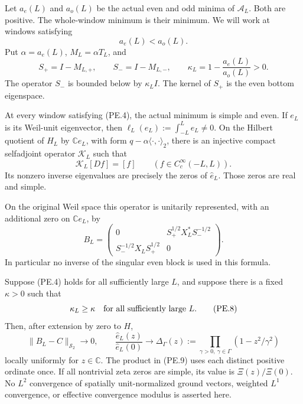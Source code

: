 Let \(a_e(L)\) and \(a_o(L)\) be the actual even and odd minima of
\(\mathscr A_L\).  Both are positive.  The whole-window minimum is
their minimum.  We will work at windows satisfying
\[
                 a_e(L)<a_o(L).
 \tag{PE.4}
\]
Put \(\alpha=a_e(L)\), \(M_L=\alpha T_L\), and
\[
 S_+=I-M_{L,+},\qquad S_-=I-M_{L,-},\qquad
 \kappa_L=1-\frac{a_e(L)}{a_o(L)}>0 .
 \tag{PE.5}
\]
The operator \(S_-\) is bounded below by \(\kappa_L I\).
The kernel of \(S_+\) is the even bottom eigenspace.

\begin{theorem}
\label{AC-S51}
At every window satisfying (PE.4), the actual minimum is simple
and even.  If \(e_L\) is its Weil-unit eigenvector, then
\(\ell_L(e_L):=\int_{-L}^L e_L\ne0\).
On the Hilbert quotient of \(H_L\) by \(\mathbb C e_L\), with form
\(q-\alpha\langle\cdot,\cdot\rangle_2\), there is an injective compact
selfadjoint operator \(\mathcal K_L\) such that
\[
 \mathcal K_L[Df]=[f]\qquad(f\in C_c^\infty(-L,L)).
 \tag{PE.6}
\]
Its nonzero inverse eigenvalues are precisely the zeros of
\(\widehat e_L\).  Those zeros are real and simple.

On the original Weil space this operator is unitarily represented,
with an additional zero on \(\mathbb C e_L\), by
\[
 B_L=
 \begin{pmatrix}
  0&S_+^{1/2}X_L^*S_-^{-1/2}\\
  S_-^{-1/2}X_LS_+^{1/2}&0
 \end{pmatrix}.
 \tag{PE.7}
\]
In particular no inverse of the singular even block is used in this
formula.

Suppose (PE.4) holds for all sufficiently large \(L\), and suppose
there is a fixed \(\kappa>0\) such that
\[
       \kappa_L\ge\kappa
       \quad\hbox{for all sufficiently large }L.
 \tag{PE.8}
\]
Then, after extension by zero to \(H\),
\[
 \|B_L-C\|_{\mathcal S_2}\longrightarrow0,\qquad
 \frac{\widehat e_L(z)}{\widehat e_L(0)}
       \longrightarrow
       \Delta_\Gamma(z):=
          \prod_{\gamma>0,\ \gamma\in\Gamma}
                    (1-z^2/\gamma^2)
 \tag{PE.9}
\]
locally uniformly for \(z\in\mathbb C\).
The product in (PE.9) uses each distinct positive ordinate once.
If all nontrivial zeta zeros are simple, its value is
\(\Xi(z)/\Xi(0)\).
No \(L^2\) convergence of spatially unit-normalized ground vectors,
weighted \(L^1\) convergence, or effective convergence modulus is
asserted here.
\end{theorem}

